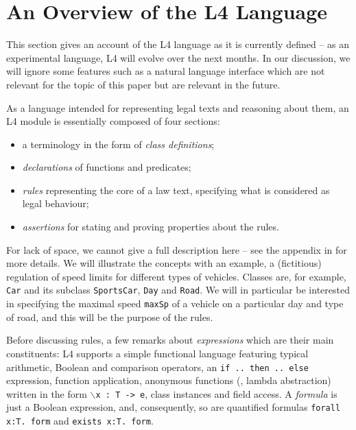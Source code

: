 \section{An Overview of the L4 Language}\label{sec:l4_language}

This section gives an account of the L4 language as it is currently defined --
as an experimental language, L4 will evolve over the next months. In our
discussion, we will ignore some features such as a natural language interface
\cite{listemnmaa2021cnl} which are not relevant for the topic of this paper
but are relevant in the future. 

As a language intended for representing legal texts and reasoning about them,
an L4 module is essentially composed of four sections:
\begin{itemize}
\item a terminology in the form of \emph{class definitions};
\item \emph{declarations} of functions and predicates;
\item \emph{rules} representing the core of a law text, specifying what is
  considered as legal behaviour;
\item \emph{assertions} for stating and proving properties about the rules.
\end{itemize}

For lack of space, we cannot give a full description here -- see the appendix
in \cite{lim22:_autom_defeas_reason_law} for more details. 
We will illustrate the concepts with an example, a (fictitious) regulation of speed
limits for different types of vehicles. Classes are, for example, \texttt{Car}
and its subclass \texttt{SportsCar}, \texttt{Day} and \texttt{Road}. We will
in particular be interested in specifying the maximal speed \texttt{maxSp} of
a vehicle on a particular day and type of road, and this will be the purpose
of the rules.

Before discussing rules, a few remarks about \emph{expressions} which are
their main constituents: L4 supports a simple functional language featuring
typical arithmetic, Boolean and comparison operators, an \texttt{if .. then
  .. else} expression, function application, anonymous functions (\ie, lambda
abstraction) written in the form \texttt{$\backslash$x : T -> e}, class
instances and field access. A \emph{formula} is just a
Boolean expression, and, consequently, so are quantified formulas
\texttt{forall x:T. form} and \texttt{exists x:T. form}.

